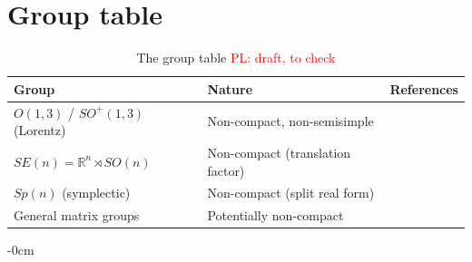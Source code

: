 \documentclass[mathematics,review,submit,moreauthors]{Definitions/mdpi}
\newcommand{\pnote}[1]{\textcolor{red}{PL: #1}}
\begin{document}



\appendixstart
\appendix
\section[\appendixname~\thesection]{Group table}

\begin{table}[ht]
    \centering
    \begin{tabularx}{\textwidth}{|l|l|X|}
        \hline
        \textbf{Group} & \textbf{Nature} & \textbf{References} \\
        \hline
        $O(1,3)$ / $SO^+(1,3)$ (Lorentz) & Non-compact, non-semisimple
            & \citep{bogatskiy2020p3icml,spinner2024,ruhe2023,ali2024,yang2023p4icml} \\
        \hline
        $SE(n) = \mathbb{R}^n \rtimes SO(n)$ & Non-compact (translation factor)
            & \citep{yarotsky2018r,finzi2020p3icml,finzi2021p3icml} \\
        \hline
        $Sp(n)$ (symplectic) & Non-compact (split real form)
            & \citep{finzi2021p3icml,pearce-crump2023p4icml} \\
        \hline
        General matrix groups & Potentially non-compact
            & \citep{finzi2021p3icml,desai2022prd} \\
        \hline
    \end{tabularx}
    \caption{The group table \pnote{draft, to check}}
    \label{tab:groups}
\end{table}


% 

\begin{adjustwidth}{-\extralength}{0cm}



\PublishersNote{}
\end{adjustwidth}
\end{document}

